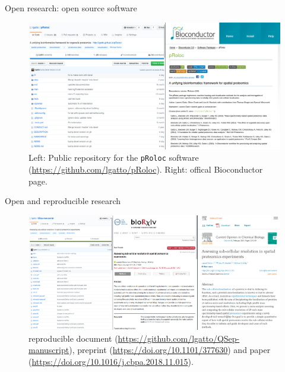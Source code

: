 


\begin{frame}{Open research: open source software}
  \centering
  \begin{figure}
  \includegraphics[width=\linewidth]{./figs_all/pRoloc_screen.png}
    \caption{\cite{Gatto:2014} Left: Public repository for the \texttt{pRoloc} software
      (\url{https://github.com/lgatto/pRoloc}). Right: offical
      Bioconductor page.}
  \end{figure}
\end{frame}

\begin{frame}{Open and reproducible research}
  \centering
  \begin{figure}
    \includegraphics[width=1\linewidth]{./figs_all/qsep_screen.png}
    \caption{\cite{Gatto:2018} reproducible document
      (\url{https://github.com/lgatto/QSep-manuscript}), preprint
      (\url{https://doi.org/10.1101/377630}) and paper
      (\url{https://doi.org/10.1016/j.cbpa.2018.11.015}).}
  \end{figure}
\end{frame}

